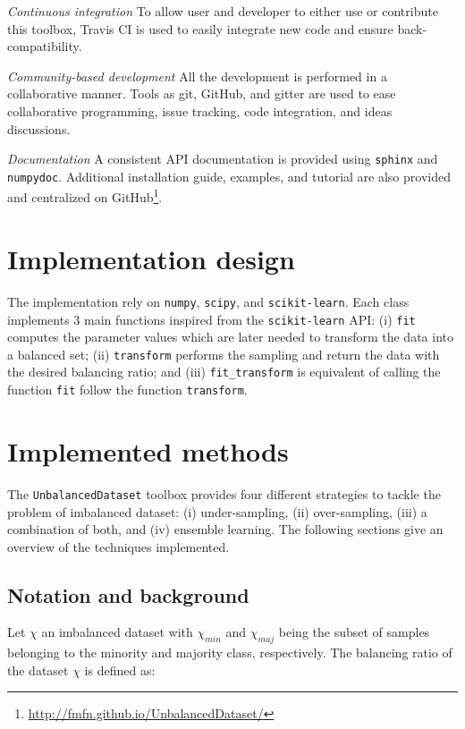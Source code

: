 \documentclass[twoside,11pt]{article}
\begin{document}
\noindent\textit{Continuous integration} To allow user and developer to either use or contribute this toolbox, Travis CI is used to easily integrate new code and ensure back-compatibility.

\noindent\textit{Community-based development} All the development is performed in a collaborative manner.
Tools as git, GitHub, and gitter are used to ease collaborative programming, issue tracking, code integration, and ideas discussions.

\noindent\textit{Documentation} A consistent API documentation is provided using \texttt{sphinx} and \texttt{numpydoc}.
Additional installation guide, examples, and tutorial are also provided and centralized on GitHub\footnote{\url{http://fmfn.github.io/UnbalancedDataset/}}.

\section{Implementation design}

The implementation rely on \texttt{numpy}, \texttt{scipy}, and \texttt{scikit-learn}.
Each class implements 3 main functions inspired from the \texttt{scikit-learn} API:
(i) \texttt{fit} computes the parameter values which are later needed to transform the data into a balanced set;
(ii) \texttt{transform} performs the sampling and return the data with the desired balancing ratio;
and (iii) \texttt{fit\_transform} is equivalent of calling the function \texttt{fit} follow the function \texttt{transform}.

\section{Implemented methods}

The \texttt{UnbalancedDataset} toolbox provides four different strategies to tackle the problem of imbalanced dataset:
(i) under-sampling, (ii) over-sampling, (iii) a combination of both, and (iv) ensemble learning.
The following sections give an overview of the techniques implemented.

\subsection{Notation and background}

Let $\chi$ an imbalanced dataset with $\chi_{min}$ and $\chi_{maj}$ being the subset of samples belonging to the minority and majority class, respectively.
The balancing ratio of the dataset $\chi$ is defined as:
\end{document}
